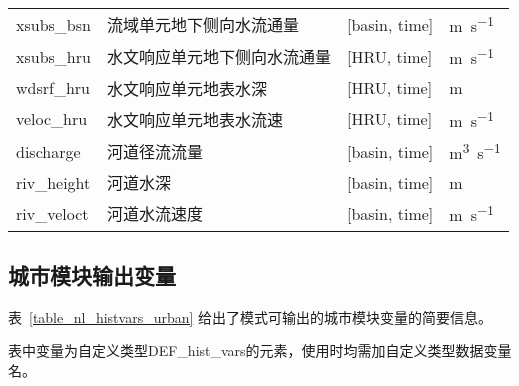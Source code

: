 \documentclass[a4paper,12pt,twoside]{article}
\begin{document}
{\begin{longtable}[htbp]{lp{}p{}l}
xsubs\_bsn   & 流域单元地下侧向水流通量 & {[}basin, time{]} & \unit{m.s^{-1}} \\
xsubs\_hru   & 水文响应单元地下侧向水流通量 & {[}HRU, time{]} & \unit{m.s^{-1}} \\
wdsrf\_hru   & 水文响应单元地表水深 & {[}HRU, time{]} & m \\
veloc\_hru   & 水文响应单元地表水流速 & {[}HRU, time{]} & \unit{m.s^{-1}} \\
discharge    & 河道径流流量 & {[}basin, time{]} & \unit{m^3.s^{-1}} \\
riv\_height  & 河道水深 & {[}basin, time{]} & \unit{m} \\
riv\_veloct  & 河道水流速度 & {[}basin, time{]} & \unit{m.s^{-1}} \\

\end{longtable}}

\subsection{城市模块输出变量}

表~\ref{table_nl_histvars_urban} 给出了模式可输出的城市模块变量的简要信息。\par
表中变量为自定义类型DEF\_hist\_vars的元素，使用时均需加自定义类型数据变量名。
\end{document}
